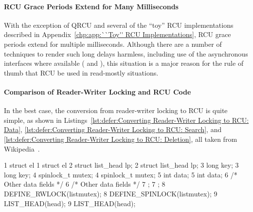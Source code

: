 \paragraph{RCU Grace Periods Extend for Many Milliseconds}

With the exception of QRCU and several of the ``toy'' RCU implementations
described in
Appendix~\ref{chp:app:``Toy'' RCU Implementations},
RCU grace periods extend for multiple milliseconds.
Although there are a number of techniques to render such long delays
harmless, including use of the asynchronous interfaces where available
( and ), this situation
is a major reason for the rule of thumb that RCU be used in read-mostly
situations.

\paragraph{Comparison of Reader-Writer Locking and RCU Code}

In the best case, the conversion from reader-writer locking to RCU
is quite simple, as shown in
Listings~\ref{lst:defer:Converting Reader-Writer Locking to RCU: Data},
\ref{lst:defer:Converting Reader-Writer Locking to RCU: Search},
and
\ref{lst:defer:Converting Reader-Writer Locking to RCU: Deletion},
all taken from
Wikipedia~\cite{WikipediaRCU}.

\begin{listing*}[htbp]
{ \scriptsize
\begin{verbbox}
 1 struct el {                           1 struct el {
 2   struct list_head lp;                2   struct list_head lp;
 3   long key;                           3   long key;
 4   spinlock_t mutex;                   4   spinlock_t mutex;
 5   int data;                           5   int data;
 6   /* Other data fields */             6   /* Other data fields */
 7 };                                    7 };
 8 DEFINE_RWLOCK(listmutex);             8 DEFINE_SPINLOCK(listmutex);
 9 LIST_HEAD(head);                      9 LIST_HEAD(head);
\end{verbbox}
}
\hspace*{0.9in}\OneColumnHSpace{-0.5in}
\theverbbox
\caption{Converting Reader-Writer Locking to RCU: Data}
\label{lst:defer:Converting Reader-Writer Locking to RCU: Data}
\end{listing*}

